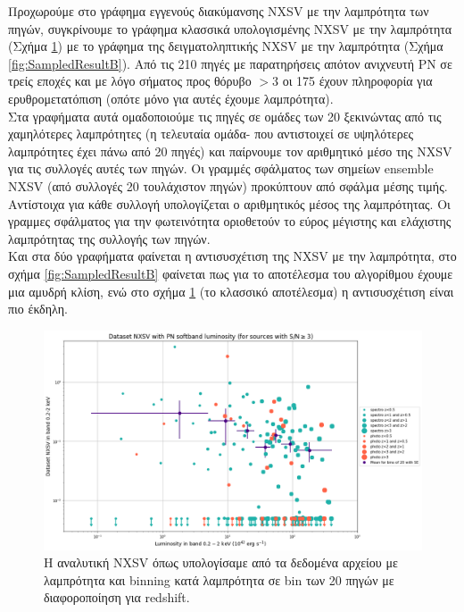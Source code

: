 Προχωρούμε στο γράφημα εγγενούς διακύμανσης \textlatin{NXSV} με την λαμπρότητα των πηγών, συγκρίνουμε το γράφημα κλασσικά υπολογισμένης \textlatin{NXSV} με την λαμπρότητα (Σχήμα \ref{fig:ClassicResult}) με το γράφημα της δειγματοληπτικής \textlatin{NXSV} με την λαμπρότητα (Σχήμα \ref{fig:SampledResultB}). Από τις 210 πηγές με παρατηρήσεις απότον ανιχνευτή ΡΝ σε τρείς εποχές και με λόγο σήματος προς θόρυβο $>3$ οι 175 έχουν πληροφορία για ερυθρομετατόπιση (οπότε μόνο για αυτές έχουμε λαμπρότητα).\\ 
Στα γραφήματα αυτά ομαδοποιούμε τις πηγές σε ομάδες των 20 ξεκινώντας από τις χαμηλότερες λαμπρότητες (η τελευταία ομάδα- που αντιστοιχεί σε υψηλότερες λαμπρότητες έχει πάνω από 20 πηγές) και παίρνουμε τον αριθμητικό μέσο της \textlatin{NXSV} για τις συλλογές αυτές των πηγών. Οι γραμμές σφάλματος των σημείων \textlatin{ensemble NXSV} (από συλλογές 20 τουλάχιστον πηγών) προκύπτουν από σφάλμα μέσης τιμής. Αντίστοιχα για κάθε συλλογή υπολογίζεται ο αριθμητικός μέσος της λαμπρότητας. Οι γραμμες σφάλματος για την φωτεινότητα οριοθετούν το εύρος μέγιστης και ελάχιστης λαμπρότητας της συλλογής των πηγών.\\
Και στα δύο γραφήματα φαίνεται η αντισυσχέτιση της \textlatin{NXSV} με την λαμπρότητα, στο σχήμα \ref{fig:SampledResultB} φαίνεται πως για το αποτέλεσμα του αλγορίθμου έχουμε μια αμυδρή κλίση, ενώ στο σχήμα \ref{fig:ClassicResult} (το κλασσικό αποτέλεσμα) η αντισυσχέτιση είναι πιο έκδηλη.

\begin{figure} \includegraphics[width=1.12\linewidth]{Figures/Classic NXSV vs Lumi w BINS.png}\caption{H αναλυτική \textlatin{NXSV} όπως υπολογίσαμε από τα δεδομένα αρχείου με λαμπρότητα και \textlatin{binning} κατά λαμπρότητα σε \textlatin{bin} των 20 πηγών με διαφοροποίηση για \textlatin{redshift.}} \label{fig:ClassicResult}  \end{figure}
 
